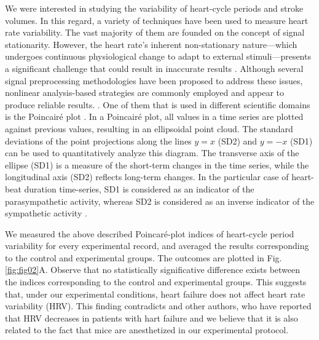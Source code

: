 \documentclass[%
preprint,
 amsmath,amssymb,
 aps,
]{revtex4-2}
\begin{document}
We were interested in studying the variability of heart-cycle periods and stroke volumes. In this regard, a variety of techniques have been used to measure heart rate variability. The vast majority of them are founded on the concept of signal stationarity. However, the heart rate's inherent non-stationary nature---which undergoes continuous physiological change to adapt to external stimuli---presents a significant challenge that could result in inaccurate results \citep{Marwan_2007}. Although several signal preprocessing methodologies have been proposed to address these issues, nonlinear analysis-based strategies are commonly employed and appear to produce reliable results. \citep{Marwan_2002, Aubert_2003, Marwan_2007, Giuliani_1998, Rajendra_Acharya_2006, Webber_1994, Henriques_2020}. One of them that is used in different scientific domains is the Poincairé plot \citep{Hoshi_2016, Webber_1994, Voss_2008}. In a Poincairé plot, all values in a time series are plotted against previous values, resulting in an ellipsoidal point cloud. The standard deviations of the point projections along the lines $y = x$ (SD2) and $y = -x$ (SD1) can be used to quantitatively analyze this diagram. The transverse axis of the ellipse (SD1) is a measure of the short-term changes in the time series, while the longitudinal axis (SD2) reflects long-term changes. In the particular case of heart-beat duration time-series, SD1 is considered as an indicator of the parasympathetic activity, whereas SD2 is considered as an inverse indicator of the sympathetic activity \citep{Zimatore_2022}.

We measured the above described Poincaré-plot indices of heart-cycle period variability for every experimental record, and averaged the results corresponding to the control and experimental groups. The outcomes are plotted in Fig. \ref{fig:fig02}A. Observe that no statistically significative difference exists between the indices corresponding to the control and experimental groups. This suggests that, under our experimental conditions, heart failure does not affect heart rate variability (HRV). This finding contradicts \citet{Kamen_1995} and other authors, who have reported that HRV decreases in patients with hart failure and we believe that it is also related to the fact that mice are anesthetized in our experimental protocol. 
\end{document}
